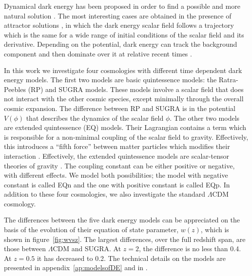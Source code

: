 Dynamical dark energy has been proposed in order to find a possible and more natural solution \citep{wetterich88,rp88}.
The most interesting cases are obtained in the presence of attractor solutions \citep{liddle99}, in which the
dark energy scalar field follows a trajectory which is the same for a wide range of initial conditions of the scalar field and its
derivative. Depending on the potential, dark energy can track the background component and then dominate over it at relative 
recent times \citep{copeland98}.

In this work we investigate four cosmologies with different time dependent dark energy models. The first two models are basic quintessence models: 
the Ratra-Peebles (RP) and SUGRA models. These models involve a scalar field that does not interact with the other cosmic species, 
except minimally through the overall cosmic expansion. The difference between RP and SUGRA is in the potential $V(\phi)$ that 
describes the dynamics of the scalar field $\phi$. The other two models are extended quintessence (EQ) models. Their Lagrangian 
contains a term which is responsible for a non-minimal coupling of the scalar field to gravity. Effectively, this introduces a 
``fifth force'' between matter particles which modifies their interaction \citep{baccigalupi00, perrotta02, pettorino05a, pettorino05b, 
pettorino08}. Effectively, the extended quintessence models are scalar-tensor theories of gravity \citep{hwang90a, hwang90b, faraoni00, 
boisseau00, esposito01, riazuelo02}. The coupling constant can be either positive or negative, with different effects. We model both 
possibilities; the model with negative constant is called EQn and the one with positive constant is called EQp. In addition to these 
four cosmologies, we also investigate the standard $\Lambda$CDM cosmology. 

The differences between the five dark energy models can be appreciated on the basis of the evolution of their equation of state parameter, $w(z)$, 
which is shown in figure~\ref{fig:wvsz}. The largest differences, over the full redshift span, are those between $\Lambda$CDM and 
SUGRA. At $z=2$, the difference is no less than 0.4. At $z=0.5$ it has decreased to 0.2. The technical details on the models are presented 
in appendix~\ref{ap:modelsofDE} and in \citet{deboni11}.

